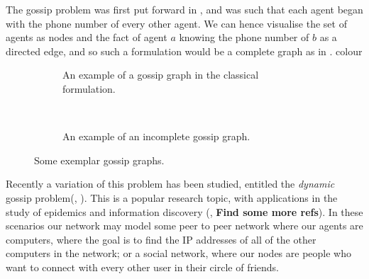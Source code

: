 \documentclass[12pt, a4paper]{article}
\begin{document}
The gossip problem was first put forward in \cite{Tijdeman:1971}, and was such
that each agent began with the phone number of every other agent. We can hence
visualise the set of agents as nodes and the fact of agent $a$ knowing the phone
number of $b$ as a directed edge, and so such a formulation would be a complete
graph as in .
colour

\bigskip

\begin{figure}[h]
  \centering
  \begin{subfigure}[c]{0.4\textwidth}
    \centering
    \caption{An example of a gossip graph in the classical formulation.}
    \label{fig:classicgossipex}
  \end{subfigure}%
  ~
  \begin{subfigure}[c] {0.4\textwidth}
    \centering
    \caption{An example of an incomplete gossip graph. }
    \label{fig:dynamicgossipex}

  \end{subfigure}
  \caption{Some exemplar gossip graphs.}
\end{figure}

Recently a variation of this problem has been studied, entitled the
\textit{dynamic} gossip problem(\cite{DynamicGossip}, \cite{EpProforDyGo}). This
is a popular research topic, with applications in the study of epidemics and
information discovery (\cite{DiscoverythruGossip}, \textbf{Find some more
  refs}). In these scenarios our network may model some peer to peer network
where our agents are computers, where the goal is to find the IP addresses of
all of the other computers in the network; or a social network, where our nodes
are people who want to connect with every other user in their circle of friends. 
\end{document}
